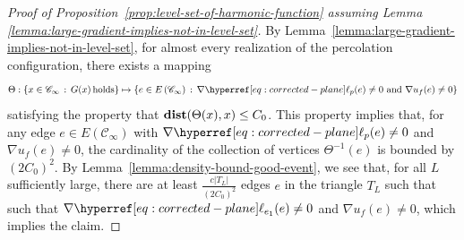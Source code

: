 \documentclass[12pt]{amsart}
\numberwithin{equation}{section}
\begin{document}
	
	
	\begin{proof}[Proof of Proposition~\ref{prop:level-set-of-harmonic-function} assuming Lemma \ref{lemma:large-gradient-implies-not-in-level-set}]
		By Lemma~\ref{lemma:large-gradient-implies-not-in-level-set}, for almost every realization of the percolation configuration, there exists a mapping
		\begin{equation*}
			\Theta : \left\{ x \in \mathscr{C}_\infty \, : \, G(x) \, \mathrm{ holds}  \right\} \mapsto \left\{ e \in E \left( \mathscr{C}_\infty \right) \, : \, \nabla \ellp{p}(e) \neq 0 \mbox{ and } \nabla u_f(e) \neq 0 \right\}
		\end{equation*}
		satisfying the property that $\operatorname{\mathop{\bf dist{}}}(\Theta (x) , x) \leq C_0$. This property implies that, for any edge $e \in E \left( \mathscr{C}_\infty \right)$ with $ \nabla \ellp{p}(e) \neq 0$ and $\nabla u_f(e) \neq 0 $, the cardinality of the collection of vertices $\Theta^{-1}(e)$ is bounded by $(2C_0)^2$. By Lemma~\ref{lemma:density-bound-good-event}, we see that, for all $L$ sufficiently large, there are at least $\frac{c |T_L|}{(2C_0)^2}$ edges $e$ in the triangle $T_L$ such that such that $ \nabla \ellp{e_1} (e) \neq 0$ and $\nabla u_f(e) \neq 0$, which implies the claim.
	\end{proof}
	
	
	
\end{document}
